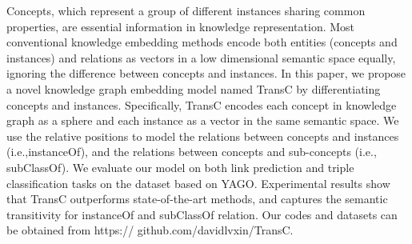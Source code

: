Concepts, which represent a group of different instances sharing common properties, are essential information in knowledge representation. Most conventional knowledge embedding methods encode both entities (concepts and instances) and relations as vectors in a low dimensional semantic space equally, ignoring the difference between concepts and instances. In this paper, we propose a novel knowledge graph embedding model named TransC by differentiating concepts and instances. Specifically, TransC encodes each concept in knowledge graph as a sphere and each instance as a vector in the same semantic space. We use the relative positions to model the relations between concepts and instances (i.e.,instanceOf), and the relations between concepts and sub-concepts (i.e., subClassOf). We evaluate our model on both link prediction and triple classification tasks on the dataset based on YAGO. Experimental results show that TransC outperforms state-of-the-art methods, and captures the semantic transitivity for instanceOf and subClassOf relation. Our codes and datasets can be obtained from https:// github.com/davidlvxin/TransC.
